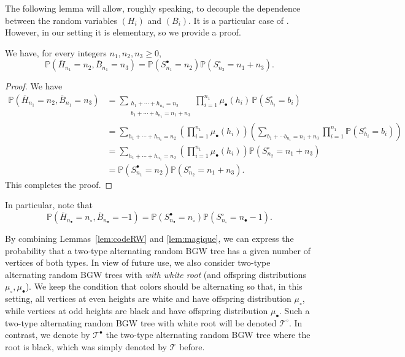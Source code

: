 \documentclass[AHL,XML,longabstracts,Unicode]{cedram}
\def\mub{\mu_{\bullet}}
\def\muc{\mu_{\circ}}
\def\nc{n_{\circ}}
\def\nb{n_{\bullet}}
\def\oB{\overline{B}}
\def\oH{\overline{H}}
\def \Tsb{\Ts^{\bullet}}
\def \Tsc{\Ts^{\circ}}
\def\Ts{\mathscr{T}}
\renewcommand\Pr[1]{\mathbb{P}\left(#1\right)}
\begin{document}
The following lemma will allow, roughly speaking, to decouple the dependence between the random variables $(H_{i})$ and $(B_{i})$. It is a particular case of \cite[Theorem 1.2]{CL16}. However, in our setting it is elementary, so we provide a proof.

\begin{lemma}\label{lem:magique}
We have, for every integers $n_{1},n_{2},n_{3} \geq 0$,
\[\Pr{\oH_{n_{1}}=n_{2},\oB_{n_{1}}=n_{3}}=\Pr{S^{\bullet}_{n_{1}}=n_{2}} \Pr{S^{\circ}_{n_{2}}=n_{1}+n_{3}}.\]
\end{lemma}

\begin{proof}
We have
\begin{align*}
\Pr{\oH_{n_{1}}=n_{2},\oB_{n_{1}}=n_{3}}&=  \sum_{\substack{h_{1}+ \cdots+h_{n_{1}} =n_{2}  \\ b_{1}+ \cdots +b_{n_{1}} =n_{1}+n_{3} }} \prod_{i=1}^{n_{1}} \mub(h_{i}) \, \Pr{S^{\circ}_{h_{i}} =b_{i}} \\
&=  \sum_{h_{1}+ \cdots+h_{n_{1}} =n_{2}  }    \left( \prod_{i=1}^{n_{1}} \mub(h_{i})  \right) \left( \sum_{ b_{1}+ \cdots b_{n_{1}} =n_{1}+n_{3}}  \prod_{i=1}^{n_{1}}\Pr{S^{\circ}_{h_{i}} =b_{i}}  \right)\\
&= \sum_{h_{1}+ \cdots+h_{n_{1}} =n_{2}}  \left( \prod_{i=1}^{n_{1}} \mub(h_{i}) \right) \Pr{S^{\circ}_{n_{2}}=n_{1}+n_{3}}\\
&=\Pr{S^{\bullet}_{n_{1}}=n_{2}} \Pr{S^{\circ}_{n_{2}}=n_{1}+n_{3}}.
\end{align*}
This completes the proof.
\end{proof}

In particular, note that
\[\Pr{\oH_{\nb}=\nc, \oB_{\nb}=-1}=\Pr{S^{\bullet}_{\nb}=\nc} \Pr{S^{\circ}_{\nc}=\nb-1}.\]

By combining  Lemmas~\ref{lem:codeRW} and \ref{lem:magique}, we can express the probability that a two-type alternating random BGW tree has a given number of vertices of both types.
In view of future use, we also consider two-type alternating random BGW trees
with {\em with white root} (and offspring distributions $\muc,\mub$).
We keep the condition that colors should be alternating so that,
in this setting, all vertices at even heights are white and have offspring distribution $\muc$,
while vertices at odd heights are black and have offspring distribution $\mub$.
Such a two-type alternating random BGW tree with white root will be denoted $\Tsc$.
In contrast, we denote by  $ \Tsb$ the two-type alternating random BGW tree where the root is black,
which was simply denoted by $\Ts$ before.
\end{document}
